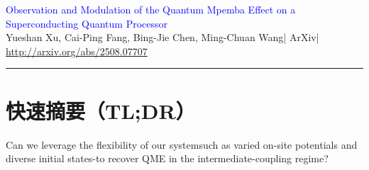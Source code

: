 \documentclass[11pt,a4paper]{article}
\newcommand{\PaperMeta}{}
\newcommand{\PaperTitle}{}
\newcommand{\PaperAuthors}{}
\newcommand{\PaperVenue}{}
\newcommand{\PaperYear}{}
\newcommand{\PaperLink}{}
\begin{document}
\renewcommand{\PaperTitle}{Observation and Modulation of the Quantum Mpemba Effect on a Superconducting Quantum Processor}
\renewcommand{\PaperAuthors}{Yueshan Xu, Cai-Ping Fang, Bing-Jie Chen, Ming-Chuan Wang}
\renewcommand{\PaperVenue}{ArXiv}
\renewcommand{\PaperYear}{2025}
\renewcommand{\PaperLink}{http://arxiv.org/abs/2508.07707}
\renewcommand{\PaperMeta}{\PaperTitle\ --- \PaperYear}

\newcommand{\paperpath}{D:/B_Dr/arXiv-2508.07707v1/}
\graphicspath{{\paperpath}}

\begin{center}
    {\LARGE \textcolor{blue}{\PaperTitle}}\\[6pt]
    {\small \PaperAuthors \quad | \quad \PaperVenue \quad | \quad \PaperYear}\\
    {\small \url{\PaperLink}}
\end{center}

\tableofcontents
\vspace{6pt}
\hrule
\vspace{10pt}

\section*{快速摘要（TL;DR）}

Can we leverage the flexibility of our systemsuch as varied on-site potentials and diverse initial states-to recover QME in the intermediate-coupling regime?
\end{document}
